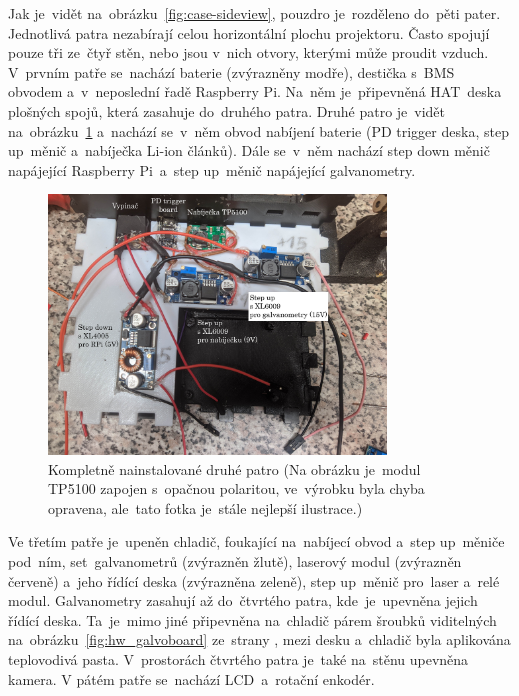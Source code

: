 Jak je~vidět na~obrázku~\ref{fig:case-sideview}, pouzdro je~rozděleno do~pěti pater. Jednotlivá patra nezabírají celou horizontální plochu projektoru. Často spojují pouze tři ze~čtyř stěn, nebo jsou v~nich otvory, kterými může proudit vzduch. V~prvním patře se~nachází baterie (zvýrazněny modře), destička s~BMS obvodem a~v~neposlední řadě Raspberry Pi.
Na~něm je~připevněná HAT~deska plošných spojů, která zasahuje do~druhého patra. Druhé patro je~vidět na~obrázku~\ref{fig:hw_layer0} a~nachází se~v~něm obvod nabíjení baterie (PD trigger deska, step up~měnič a~nabíječka Li-ion článků).
Dále se~v~něm nachází step down měnič napájející Raspberry Pi~a~step up~měnič napájející galvanometry.
\begin{figure}[htb]
  \centering
  \includegraphics[width=0.8\textwidth]{img/hw_layer0.jpg}
  \caption{\label{fig:hw_layer0} Kompletně nainstalované druhé patro (Na obrázku je~modul TP5100 zapojen s~opačnou polaritou, ve~výrobku byla chyba opravena, ale~tato fotka je~stále nejlepší ilustrace.)}
\end{figure}

Ve třetím patře je~upeněn chladič, foukající na~nabíjecí obvod a~step up~měniče pod~ním, set~galvanometrů (zvýrazněn žlutě), laserový modul (zvýrazněn červeně) a~jeho řídící deska (zvýrazněna zeleně), step up~měnič pro~laser a~relé modul.  
Galvanometry zasahují až do~čtvrtého patra, kde~je~upevněna jejich řídící deska. Ta~je~mimo jiné připevněna na~chladič párem šroubků viditelných na~obrázku~\ref{fig:hw_galvoboard} ze~strany \pageref{fig:hw_galvoboard}, mezi desku a~chladič byla aplikována teplovodivá pasta. V~prostorách čtvrtého patra je~také na~stěnu upevněna kamera.
V pátém patře se~nachází LCD~a~rotační enkodér.

